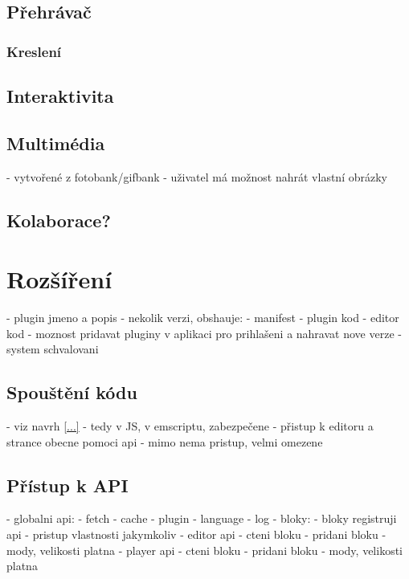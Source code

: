 \subsection{Přehrávač}
\subsubsection{Kreslení}

\subsection{Interaktivita}

\subsection{Multimédia}

- vytvořené z fotobank/gifbank
- uživatel má možnost nahrát vlastní obrázky

\subsection{Kolaborace?}

\section{Rozšíření}

- plugin jmeno a popis
- nekolik verzi, obshauje:
  - manifest
  - plugin kod
  - editor kod
- moznost pridavat pluginy v aplikaci pro prihlašeni a nahravat nove verze
- system schvalovani

\subsection{Spouštění kódu}

- viz navrh \ref{...}
- tedy v JS, v emscriptu, zabezpečene
- přistup k editoru a strance obecne pomoci api
- mimo nema pristup, velmi omezene

\subsection{Přístup k API}

- globalni api:
   - fetch
   - cache
   - plugin
   - language
   - log
- bloky:
   - bloky registruji api
   - pristup vlastnosti jakymkoliv
- editor api
   - cteni bloku
   - pridani bloku
   - mody, velikosti platna
- player api
   - cteni bloku
   - pridani bloku
   - mody, velikosti platna

